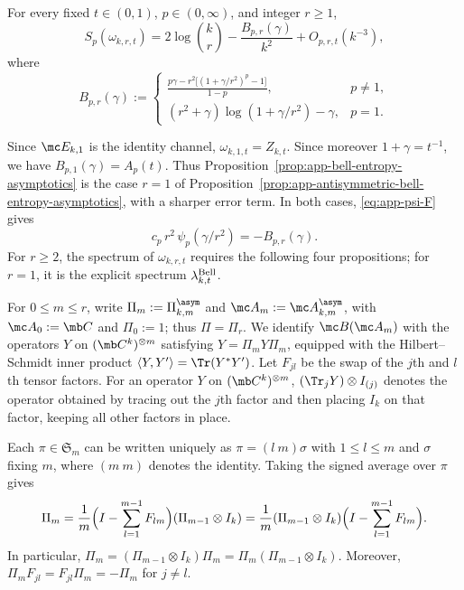\begin{proposition}
\label{prop:app-antisymmetric-bell-entropy-asymptotics}
For every fixed \(t\in(0,1)\), \(p\in(0,\infty)\), and integer \(r\geq1\),
\begin{equation}
    S_p(\omega_{k,r,t})
       =
       2\log\binom{k}{r}
       -\frac{B_{p,r}(\gamma)}{k^2}
       +O_{p,r,t}(k^{-3}),
    \label{eq:app-antisymmetric-bell-entropy-asymptotics}
\end{equation}
where
\begin{equation}
    B_{p,r}(\gamma)
       :=
       \begin{cases}
       \displaystyle
       \frac{p\gamma-r^2\bigl[(1+\gamma/r^2)^p-1\bigr]}{1-p},
           & p\neq1,\\[8pt]
       \displaystyle
       (r^2+\gamma)\log(1+\gamma/r^2)-\gamma,
           & p=1.
       \end{cases}
\end{equation}
\end{proposition}
 
Since \(\mc E_{k,1}\) is the identity channel,
\(\omega_{k,1,t}=Z_{k,t}\).  Since moreover \(1+\gamma=t^{-1}\), we have
\(B_{p,1}(\gamma)=A_p(t)\).  Thus
Proposition~\ref{prop:app-bell-entropy-asymptotics} is the case \(r=1\)
of Proposition~\ref{prop:app-antisymmetric-bell-entropy-asymptotics},
with a sharper error term.  In both cases, \eqref{eq:app-psi-F} gives
\begin{equation}
    c_p\,r^2\,\psi_p(\gamma/r^2)=-B_{p,r}(\gamma).
    \label{eq:app-B-identity}
\end{equation}
For \(r\geq2\), the spectrum of \(\omega_{k,r,t}\) requires the
following four propositions; for \(r=1\), it is the explicit spectrum
\(\lambda^{\rm Bell}_{k,t}\).
 
For \(0\le m\le r\), write \(\Pi_m:=\Pi_{k,m}^{\asym}\) and
\(\mc A_m:=\mc A_{k,m}^{\asym}\), with \(\mc A_0:=\mb C\) and
\(\Pi_0:=1\); thus \(\Pi=\Pi_r\).  We identify \(\mc B(\mc A_m)\) with
the operators \(Y\) on \((\mb C^k)^{\otimes m}\) satisfying
\(Y=\Pi_mY\Pi_m\), equipped with the Hilbert--Schmidt inner product
\(\langle Y,Y'\rangle=\Tr(Y^*Y')\).  Let \(F_{jl}\) be the swap of the
\(j\)th and \(l\)th tensor factors.  For an operator \(Y\) on
\((\mb C^k)^{\otimes m}\), \((\Tr_jY)\otimes I_{(j)}\) denotes the
operator obtained by tracing out the \(j\)th factor and then placing
\(I_k\) on that factor, keeping all other factors in place.
 
Each \(\pi\in\mathfrak S_m\) can be written uniquely as \(\pi=(l\ m)\sigma\)
with \(1\le l\le m\) and \(\sigma\) fixing \(m\), where \((m\ m)\) denotes
the identity.  Taking the signed average over \(\pi\) gives
\begin{equation}
    \Pi_m
    =\frac1m\Bigl(I-\sum_{l=1}^{m-1}F_{lm}\Bigr)(\Pi_{m-1}\otimes I_k)
    =\frac1m(\Pi_{m-1}\otimes I_k)\Bigl(I-\sum_{l=1}^{m-1}F_{lm}\Bigr).
    \label{eq:app-antisym-recursion}
\end{equation}
In particular,
\(\Pi_m=(\Pi_{m-1}\otimes I_k)\Pi_m=\Pi_m(\Pi_{m-1}\otimes I_k)\).
Moreover, \(\Pi_mF_{jl}=F_{jl}\Pi_m=-\Pi_m\) for \(j\neq l\).
 
